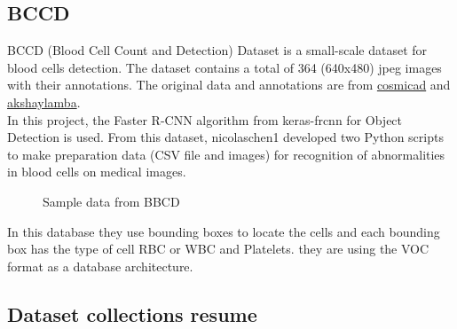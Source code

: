 {\subsection{BCCD}
\hspace{\parindent}
BCCD (Blood Cell Count and Detection) Dataset is a small-scale dataset for blood cells detection. The dataset contains a total of 364 (640x480) jpeg images with their annotations. The original data and annotations are from \href{https://github.com/cosmicad/dataset}{cosmicad} and \href{https://github.com/akshaylamba/all_CELL_data}{akshaylamba}.\\
In this project, the Faster R-CNN algorithm from keras-frcnn for Object Detection is used. From this dataset, nicolaschen1 developed two Python scripts to make preparation data (CSV file and images) for recognition of abnormalities in blood cells on medical images.

\begin{figure}[H]
\centering
\caption{Sample data from BBCD}
\label{fig:BBCD1}
\end{figure}

In this database they use bounding boxes to locate the cells and each bounding box has the type of cell RBC or WBC and Platelets. they are using the VOC format as a database architecture.

\subsection{Dataset collections resume}
\hspace{\parindent}



}
